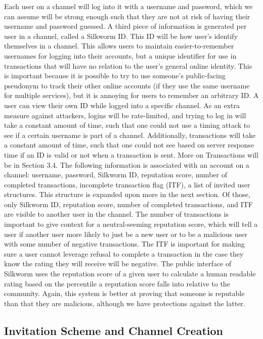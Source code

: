 \documentclass[letterpaper,twocolumn,10pt]{article}
\begin{document}
Each user on a channel will log into it with a username and password, which we can assume will be strong enough such that they are not at risk of having their username and password guessed. A third piece of information is generated per user in a channel, called a Silkworm ID. This ID will be how user's identify themselves in a channel. This allows users to maintain easier-to-remember usernames for logging into their accounts, but a unique identifier for use in transactions that will have no relation to the user's general online identity. This is important because it is possible to try to use someone's public-facing pseudonym to track their other online accounts (if they use the same username for multiple services), but it is annoying for users to remember an arbitrary ID. A user can view their own ID while logged into a specific channel. As an extra measure against attackers, logins will be rate-limited, and trying to log in will take a constant amount of time, such that one could not use a timing attack to see if a certain username is part of a channel. Additionally, transactions will take a constant amount of time, such that one could not see based on server response time if an ID is valid or not when a transaction is sent. More on Transactions will be in Section $3.4$. 
The following information is associated with an account on a channel: username, password, Silkworm ID, reputation score, number of completed transactions, incomplete transaction flag (ITF), a list of invited user structures. This structure is expanded upon more in the next section. Of those, only Silkworm ID, reputation score, number of completed transactions, and ITF are visible to another user in the channel. The number of transactions is important to give context for a neutral-seeming reputation score, which will tell a user if another user more likely to just be a new user or to be a malicious user with some number of negative transactions. The ITF is important for making sure a user cannot leverage refusal to complete a transaction in the case they know the rating they will receive will be negative. The public interface of Silkworm uses the reputation score of a given user to calculate a human readable rating based on the percentile a reputation score falls into relative to the community. Again, this system is better at proving that someone is reputable than that they are malicious, although we have protections against the latter. 

\subsection{Invitation Scheme and Channel Creation}
\end{document}
